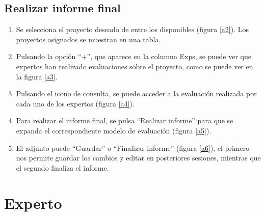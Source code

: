 \documentclass[12pt,a4paper,spanish,twoside]{book}
\begin{document}
\subsection{Realizar informe final}
\begin{enumerate}
\item Se selecciona el proyecto deseado de entre los disponibles (figura 
  \ref{a2}). Los proyectos asignados se muestran en una tabla.
  

\item Pulsando la opción ``+'', que aparece en la columna Exps, se puede ver que
  expertos han realizado evaluaciones sobre el proyecto, como se puede ver en
  la figura \ref{a3}. 


\item Pulsando el icono de consulta, se puede acceder a la evaluación realizada 
  por cada uno de los expertos (figura \ref{a4}).


\item Para realizar el informe final, se pulsa ``Realizar informe'' 
  para que se expanda el correspondiente modelo de evaluación (figura \ref{a5}).
  

\item El adjunto puede ``Guardar'' o ``Finalizar informe'' 
  (figura \ref{a6}), el primero nos permite guardar los cambios y editar en 
  posteriores sesiones, mientras que el segundo finaliza el informe.
  
\end{enumerate}

\section{Experto}
\end{document}
